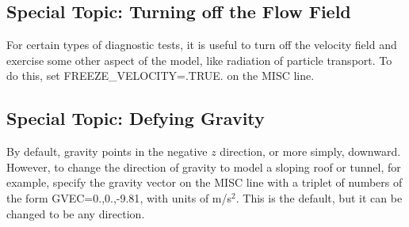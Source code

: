 \documentclass[11pt]{book}
\begin{document}
\subsection{Special Topic: Turning off the Flow Field}
\label{info:freeze_velocity}

For certain types of diagnostic tests, it is useful to turn off the velocity field and exercise some other aspect of the model, like radiation of particle transport. To do this, set {\ct FREEZE\_VELOCITY=.TRUE.} on the {\ct MISC} line.


\subsection{Special Topic: Defying Gravity}
\label{info:GVEC}

By default, gravity points in the negative $z$ direction, or more simply, downward. However, to change the direction of gravity to model a sloping roof or tunnel, for example, specify the gravity vector on the {\ct MISC} line with a triplet of numbers of the form {\ct GVEC=0.,0.,-9.81}, with units of m/s$^2$. This is the default, but it can be changed to be any direction.
\end{document}
